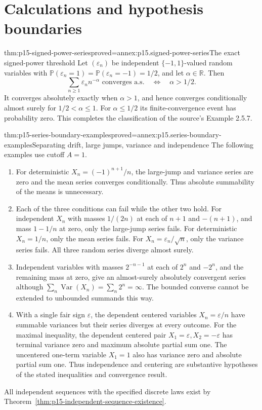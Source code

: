 \section{Calculations and hypothesis boundaries}
\label{sec:p15-series-examples}

\begin{hbtheorem}{thm:p15-signed-power-series}{proved=annex:p15.signed-power-series}{The exact signed-power threshold}
Let \((\varepsilon_n)\) be independent \(\{-1,1\}\)-valued random variables with
\(\mathbb P(\varepsilon_n=1)=\mathbb P(\varepsilon_n=-1)=1/2\),
and let \(\alpha\in\mathbb R\). Then
\[
 \sum_{n\geq1}\varepsilon_n n^{-\alpha}
       \text{ converges a.s.}\quad\Longleftrightarrow\quad\alpha>1/2.
\]
It converges absolutely exactly when \(\alpha>1\), and hence
converges conditionally almost surely for \(1/2<\alpha\leq1\).
For \(\alpha\leq1/2\) its finite-convergence event has probability
zero. This completes the classification of the source's Example 2.5.7.
\end{hbtheorem}

\begin{hbtheorem}{thm:p15-series-boundary-examples}{proved=annex:p15.series-boundary-examples}{Separating drift, large jumps, variance and independence}
The following examples use cutoff \(A=1\).
\begin{enumerate}
\item For deterministic \(X_n=(-1)^{n+1}/n\), the large-jump and
variance series are zero and the mean series converges conditionally.
Thus absolute summability of the means is unnecessary.
\item Each of the three conditions can fail while the other two hold.
For independent \(X_n\) with masses \(1/(2n)\) at each of
\(n+1\) and \(-(n+1)\), and mass \(1-1/n\) at zero, only the
large-jump series fails. For deterministic \(X_n=1/n\), only the
mean series fails. For \(X_n=\varepsilon_n/\sqrt n\), only the
variance series fails. All three random series diverge almost surely.
\item Independent variables with masses \(2^{-n-1}\) at each of
\(2^n\) and \(-2^n\), and the remaining mass at zero, give an
almost-surely absolutely convergent series although
\(\sum_n\operatorname{Var}(X_n)=\sum_n2^n=\infty\).
The bounded converse cannot be extended to unbounded summands this way.
\item With a single fair sign \(\varepsilon\), the dependent
centered variables \(X_n=\varepsilon/n\) have summable variances
but their series diverges at every outcome. For the maximal inequality,
the dependent centered pair \(X_1=\varepsilon,X_2=-\varepsilon\)
has terminal variance zero and maximum absolute partial sum one.
The uncentered one-term variable \(X_1=1\) also has variance zero
and absolute partial sum one. Thus independence and centering are
substantive hypotheses of the stated inequalities and convergence result.
\end{enumerate}
All independent sequences with the specified discrete laws exist by
Theorem~\ref{thm:p15-independent-sequence-existence}.
\end{hbtheorem}

